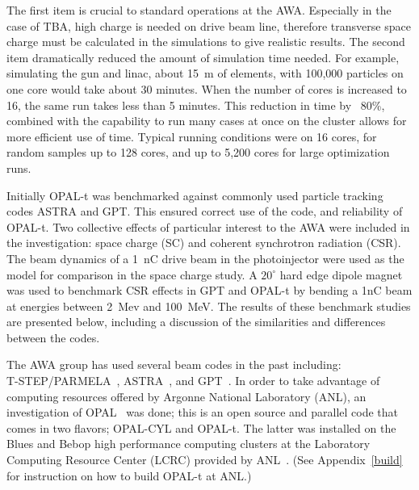 The first item is crucial to standard operations at the AWA. Especially in the 
case of TBA, high charge is needed on drive beam line, therefore transverse 
space charge must be calculated in the simulations to give realistic results.
The second item dramatically reduced the amount of simulation time needed. 
For example, simulating the gun and linac, about \SI{15}{m} of elements,
with 100,000 particles on one core would take about 30 minutes. 
When the number of cores is increased to 16, the same run takes less than 
5 minutes. This reduction in time by ~80\%, combined with the capability to run 
many cases at once on the cluster allows for more efficient use of time.
Typical running conditions were on 16 cores, for random samples up to 128 cores, 
and up to 5,200 cores for large optimization runs.  


\label{sec:bench}

Initially OPAL-t was benchmarked against commonly used particle tracking codes ASTRA and GPT.  
This ensured correct use of the code, and reliability of \mbox{OPAL-t}.  
Two collective effects of particular interest to the AWA were included in the investigation: 
space charge (SC) and coherent synchrotron radiation (CSR).
The beam dynamics of a \SI{1}{nC} drive beam in the photoinjector were used as 
the model for comparison in the space charge study. 
A $20^{\circ}$ hard edge dipole magnet was used to benchmark CSR effects in GPT and OPAL-t by bending a 1nC beam 
at energies between \SI{2}{Mev} and \SI{100}{MeV}.  
The results of these benchmark studies are presented below, 
including a discussion of the similarities and differences between the codes.
 
The AWA group has used several beam codes in the past including:\\
\mbox{T-STEP/PARMELA}~\cite{parmela}, ASTRA~\cite{astra}, and GPT~\cite{gpt}.  
In order to take advantage of computing resources offered by 
Argonne National Laboratory (ANL), an investigation of 
OPAL~\cite{opal} was done; this is an open source and parallel code that comes in two flavors;  
OPAL-CYL and OPAL-t. The latter was installed on the Blues and Bebop high performance computing clusters
at the Laboratory Computing Resource Center (LCRC) provided by ANL~\cite{lcrc}.
(See Appendix~\ref{build} for instruction on how to build OPAL-t at ANL.)

